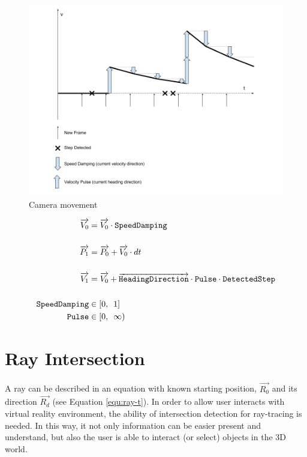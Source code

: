 \begin{figure}[H]
\caption{Camera movement}
\label{fig:camera-movement}
\centering
\includegraphics[width=\textwidth, keepaspectratio]{Figures/camera-movement.png}
\decoRule
\end{figure}

\[
\begin{array}{lr}
\begin{aligned}
\overrightarrow{V_0} &= \overrightarrow{V_0} \cdot \texttt{SpeedDamping}\\\\
\overrightarrow{P_1} &= \overrightarrow{P_0} + \overrightarrow{V_0} \cdot dt\\\\
\overrightarrow{V_1} &= \overrightarrow{V_0} + \overrightarrow{\texttt{HeadingDirection}} \cdot \texttt{Pulse} \cdot \texttt{DetectedStep}\\\\
\texttt{SpeedDamping} &\in [0,\enspace 1]\\
\texttt{Pulse} &\in [0,\enspace \infty)\\
\end{aligned}
\end{array}
\]

\section{Ray Intersection}

A ray can be described in an equation with known starting position, $\overrightarrow{R_0}$ and its direction $\overrightarrow{R_d}$ (see Equation \ref{equ:ray-t}). In order to allow user interacts with virtual reality environment, the ability of intersection detection for ray-tracing is needed. In this way, it not only information can be easier present and understand, but also the user is able to interact (or select) objects in the 3D world. 

